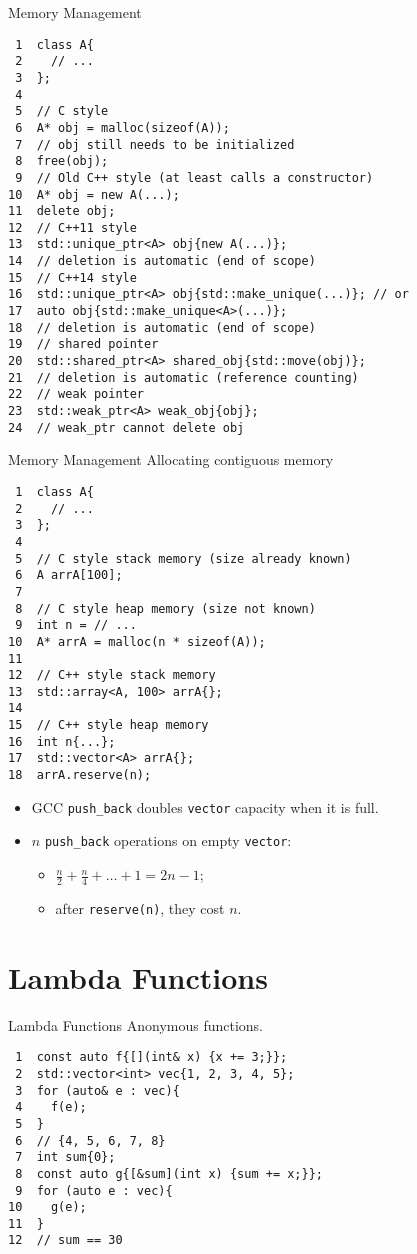 \documentclass[presentation]{beamer}
\begin{document}
\begin{frame}[label={sec:org67822f2},fragile]{Memory Management}
 \begin{verbatim}
 1  class A{
 2    // ...
 3  };
 4  
 5  // C style
 6  A* obj = malloc(sizeof(A));
 7  // obj still needs to be initialized
 8  free(obj);
 9  // Old C++ style (at least calls a constructor)
10  A* obj = new A(...);
11  delete obj;
12  // C++11 style
13  std::unique_ptr<A> obj{new A(...)};
14  // deletion is automatic (end of scope)
15  // C++14 style
16  std::unique_ptr<A> obj{std::make_unique(...)}; // or
17  auto obj{std::make_unique<A>(...)};
18  // deletion is automatic (end of scope)
19  // shared pointer
20  std::shared_ptr<A> shared_obj{std::move(obj)};
21  // deletion is automatic (reference counting)
22  // weak pointer
23  std::weak_ptr<A> weak_obj{obj};
24  // weak_ptr cannot delete obj
\end{verbatim}
\end{frame}
\begin{frame}[label={sec:org59f1241},fragile]{Memory Management}
 Allocating contiguous memory
\begin{verbatim}
 1  class A{
 2    // ...
 3  };
 4  
 5  // C style stack memory (size already known)
 6  A arrA[100];
 7  
 8  // C style heap memory (size not known)
 9  int n = // ...
10  A* arrA = malloc(n * sizeof(A));
11  
12  // C++ style stack memory
13  std::array<A, 100> arrA{};
14  
15  // C++ style heap memory
16  int n{...};
17  std::vector<A> arrA{};
18  arrA.reserve(n);
\end{verbatim}
\begin{itemize}
\item GCC \texttt{push\_back} doubles \texttt{vector} capacity when it is full.
\item \(n\) \texttt{push\_back} operations on empty \texttt{vector}:
\begin{itemize}
\item \(\frac{n}{2} + \frac{n}{4} + \dots + 1 = 2n - 1\);
\item after \texttt{reserve(n)}, they cost \(n\).
\end{itemize}
\end{itemize}
\end{frame}
\section{Lambda Functions}
\label{sec:org4d3705c}
\begin{frame}[label={sec:org5674657},fragile]{Lambda Functions}
 Anonymous functions.
\begin{verbatim}
 1  const auto f{[](int& x) {x += 3;}};
 2  std::vector<int> vec{1, 2, 3, 4, 5};
 3  for (auto& e : vec){
 4    f(e);
 5  }
 6  // {4, 5, 6, 7, 8}
 7  int sum{0};
 8  const auto g{[&sum](int x) {sum += x;}};
 9  for (auto e : vec){
10    g(e);
11  }
12  // sum == 30
\end{verbatim}
\end{frame}
\end{document}
